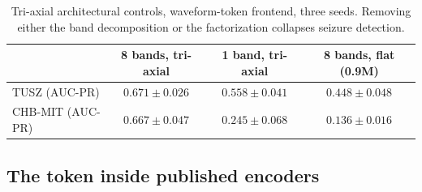 \begin{table}[t]
\centering
\small
\caption{Axis-free design variants, single seeds. ``fold'' = band rows
folded into spatial attention; ``strength'' = explicit $|Z|$ feature.}
\label{tab:design}
\end{table}

\begin{table}[t]
\centering
\small
\caption{Tri-axial architectural controls, waveform-token frontend, three
seeds. Removing either the band decomposition or the factorization
collapses seizure detection.}
\label{tab:arch}
\begin{tabular}{lccc}
\toprule
 & 8 bands, tri-axial & 1 band, tri-axial & 8 bands, flat (0.9M) \\
\midrule
TUSZ (AUC-PR) & $0.671 \pm 0.026$ & $0.558 \pm 0.041$ & $0.448 \pm 0.048$ \\
CHB-MIT (AUC-PR) & $0.667 \pm 0.047$ & $0.245 \pm 0.068$ & $0.136 \pm 0.016$ \\
\bottomrule
\end{tabular}
\end{table}

\subsection{The token inside published encoders}
\label{sec:transplant}

